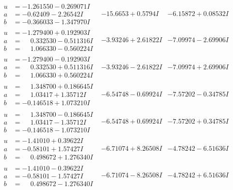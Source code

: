 \documentclass[1p]{elsarticle_modified}
\theoremstyle{definition}
\begin{document}
$$\begin{array}{c|c|c}
\begin{aligned}
u &= -1.261550 - 0.269071 I \\
a &= -0.62409 - 2.26542 I \\
b &= -0.366033 - 1.347970 I\end{aligned}
 & -15.6653 + 0.5794 I & -6.15872 + 0.08532 I \\ \hline\begin{aligned}
u &= -1.279400 + 0.192903 I \\
a &= \phantom{-}0.332530 - 0.511316 I \\
b &= \phantom{-}1.066330 - 0.560224 I\end{aligned}
 & -3.93246 + 2.61822 I & -7.09974 - 2.69906 I \\ \hline\begin{aligned}
u &= -1.279400 - 0.192903 I \\
a &= \phantom{-}0.332530 + 0.511316 I \\
b &= \phantom{-}1.066330 + 0.560224 I\end{aligned}
 & -3.93246 - 2.61822 I & -7.09974 + 2.69906 I \\ \hline\begin{aligned}
u &= \phantom{-}1.348700 + 0.186645 I \\
a &= \phantom{-}1.03417 + 1.35712 I \\
b &= -0.146518 + 1.073210 I\end{aligned}
 & -6.54748 - 0.69924 I & -7.57202 - 0.34785 I \\ \hline\begin{aligned}
u &= \phantom{-}1.348700 - 0.186645 I \\
a &= \phantom{-}1.03417 - 1.35712 I \\
b &= -0.146518 - 1.073210 I\end{aligned}
 & -6.54748 + 0.69924 I & -7.57202 + 0.34785 I \\ \hline\begin{aligned}
u &= -1.41010 + 0.39622 I \\
a &= -0.58101 + 1.57427 I \\
b &= \phantom{-}0.498672 + 1.276340 I\end{aligned}
 & -6.71074 + 8.26508 I & -4.78242 - 6.51636 I \\ \hline\begin{aligned}
u &= -1.41010 - 0.39622 I \\
a &= -0.58101 - 1.57427 I \\
b &= \phantom{-}0.498672 - 1.276340 I\end{aligned}
 & -6.71074 - 8.26508 I & -4.78242 + 6.51636 I \\ \hline\begin{aligned}

\end{aligned}
\end{array}$$
\end{document}
